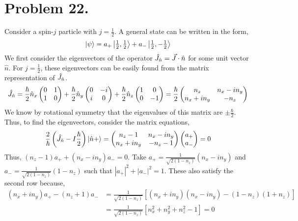 \documentclass[12pt]{extarticle}
\newcommand{\Jn}{\J_{\hat{n}}}
\begin{document}
 
\section*{Problem 22.}
Consider a spin-$j$ particle with $j = \tfrac{1}{2}$. A general state can be written in the form, 
\[\left| \psi \right> = a_{+} \left| \tfrac{1}{2}, \tfrac{1}{2} \right> + a_{-} \left| \tfrac{1}{2}, -\tfrac{1}{2} \right>\] 
We first consider the eigenvectors of the operator $\Jn = \vec{J} \cdot \hat{n}$ for some unit vector $\hat{n}$. For $j = \tfrac{1}{2}$, these eigenvectors can be easily found from the matrix representation of $\Jn$. 
\begin{align*}
\Jn = \frac{\hbar}{2} \hat{n}_x 
\begin{pmatrix}
0 & 1 \\
1 & 0
\end{pmatrix}
+ \frac{\hbar}{2} \hat{n}_y
\begin{pmatrix}
0 & -i \\
i & 0
\end{pmatrix}
+ \frac{\hbar}{2} \hat{n}_z
\begin{pmatrix}
1 & 0 \\
0 & -1
\end{pmatrix}
= \frac{\hbar}{2}
\begin{pmatrix}
n_z & n_x - i n_y \\
n_x + i n_y & -n_z
\end{pmatrix}
\end{align*}
We know by rotational symmetry that the eigenvalues of this matrix are $\pm \frac{\hbar}{2}$. Thus, to find the eigenvectors, consider the matrix equations,
\begin{align*}
\frac{2}{\hbar} \left(\Jn - I \frac{\hbar}{2}\right) \ket{\hat{n} +} = 
\begin{pmatrix}
n_z - 1 & n_x - i n_y \\
n_x + i n_y & - n_z - 1
\end{pmatrix}
\begin{pmatrix}
a_{+} \\
a_{-}
\end{pmatrix}
= 0
\end{align*}
Thus, $(n_z - 1) a_{+} + (n_x - i n_y) a_{-} = 0$. Take $a_{+} = \frac{1}{\sqrt{2(1- n_z)}} (n_{x} - i n_{y})$ and $a_{-} = \frac{1}{\sqrt{2(1- n_z)}} (1 - n_z)$ such that $|a_{+}|^2 + |a_{-}|^2 = 1$. These also satisfy the second row because, 
\begin{align*}
(n_x + i n_y)a_{+} - (n_z + 1) a_{-} & = \frac{1}{\sqrt{2 ( 1 - n_z)}} \left[(n_x + i n_y)(n_x - i n_y) - (1 - n_z)(1 + n_z) \right] \\ & = \frac{1}{\sqrt{2 ( 1 - n_z)}} \left[n_x^2 + n_y^2 + n_z^2 - 1 \right] = 0
\end{align*}
\end{document}
